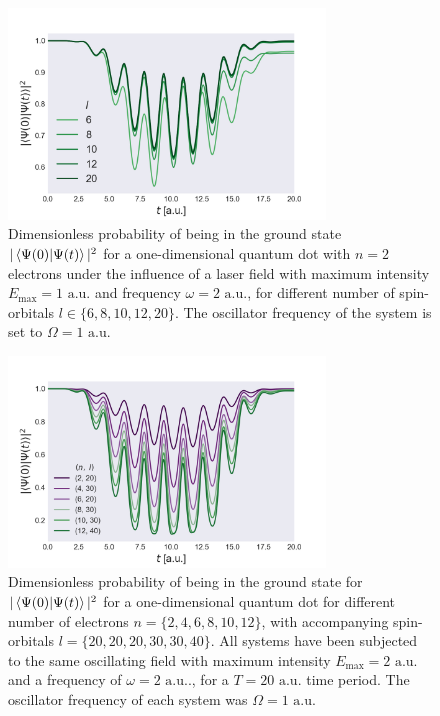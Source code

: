 \begin{figure}
    \centering
    \includegraphics[width=0.75\textwidth]{results/figures/1D/n=2overlap.png} 
    \caption{Dimensionless probability of being in the ground state $|\braket*{\Psi(0)}{\Psi(t)}|^2$
        for a one-dimensional quantum dot with $n=2$ electrons under 
        the influence of a laser field with maximum intensity $E_\text{max} = 1 \text{ a.u.}$
        and frequency $\omega = 2 \text{ a.u.}$, for different number of spin-orbitals 
        $l\in\{6,8,10,12,20\}$. The oscillator frequency of the system is set to
        $\Omega = 1 \text{ a.u.}$
    }
    \label{fig:1d_n2_overlap}
\end{figure}

\begin{figure}
    \centering
    \includegraphics[width=0.75\textwidth]{results/figures/1D/n_compare_overlap_2.png} 
    \caption{Dimensionless probability of being in the ground state for $|\braket*{\Psi(0)}{\Psi(t)}|^2$
        for a one-dimensional quantum dot for different number of electrons 
        $n = \{2,4,6,8,10,12\}$, with accompanying spin-orbitals $l=\{20,20,20,30,30,40\}$.
        All systems have been subjected to the same oscillating field with maximum intensity 
        $E_\text{max} = 2 \text{ a.u.}$ and a frequency of $\omega = 2 \text{ a.u.}.$, for 
        a $T= 20 \text{ a.u.}$ time period. The oscillator frequency of each system was
        $\Omega = 1 \text{ a.u.}$
    }
    \label{fig:1d_ground_state_prob_compare}
\end{figure}

